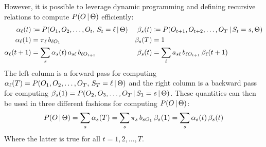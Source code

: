 			However, it is possible to leverage dynamic programming and defining recursive relations to compute \( P(O \,\vert\, \Theta) \) efficiently:
			\begin{align}
				\alpha_\ell(t)     & \coloneqq P(O_1, O_2, \dots, O_t,\, S_t = \ell \,\vert\, \Theta) & \beta_s(t) & \coloneqq P(O_{t + 1}, O_{t + 2}, \dots, O_T \,\vert\, S_t = s, \Theta) \\
				\alpha_\ell(1)     & = \pi_\ell \, b_{\ell O_1}                                    & \beta_s(T) & = 1                                                                  \\
				\alpha_\ell(t + 1) & = \sum_s \alpha_s(t) \, a_{s \ell} \, b_{\ell O_{t + 1}}      & \beta_s(t) & = \sum_\ell a_{s \ell} \, b_{\ell O_{t + 1}} \, \beta_\ell(t + 1)
			\end{align}
			The left column is a forward pass for computing \( \alpha_\ell(T) = P(O_1, O_2, \dots, O_T,\, S_T = \ell \,\vert\, \Theta) \) and the right column is a backward pass for computing \( \beta_s(1) = P(O_2, O_3, \dots, O_T \,\vert\, S_1 = s \,\vert\, \Theta) \). These quantities can then be used in three different fashions for computing \( P(O \,\vert\, \Theta) \):
			\begin{equation}
				P(O \,\vert\, \Theta)
				= \sum_s \alpha_s(T)
				= \sum_s \pi_s \, b_{s O_1} \, \beta_s(1)
				= \sum_s \alpha_s(t) \, \beta_s(t)
			\end{equation}
			Where the latter is true for all \( t = 1, 2, \dots, T \).

